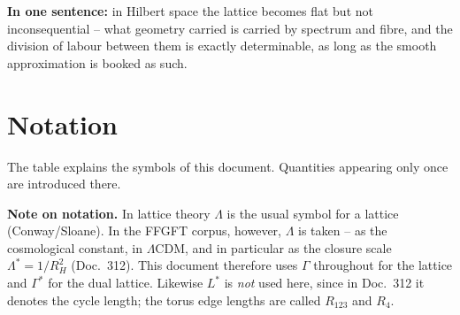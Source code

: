 \documentclass[11pt]{report}
\begin{document}
\medskip
\noindent\textbf{In one sentence:} in Hilbert space the lattice
becomes flat but not inconsequential -- what geometry carried is
carried by spectrum and fibre, and the division of labour between
them is exactly determinable, as long as the smooth approximation is
booked as such.

\section*{Notation}

The table explains the symbols of this document. Quantities
appearing only once are introduced there.

\textbf{Note on notation.} In lattice theory $\Lambda$ is the usual
symbol for a lattice (Conway/Sloane). In the FFGFT corpus, however,
$\Lambda$ is taken -- as the cosmological constant, in
$\Lambda$CDM, and in particular as the closure scale
$\Lambda^{*} = 1/R_H^2$ (Doc.~312). This document therefore uses
$\Gamma$ throughout for the lattice and $\Gamma^{*}$ for the dual
lattice. Likewise $L^{*}$ is \emph{not} used here, since in
Doc.~312 it denotes the cycle length; the torus edge lengths are
called $R_{123}$ and $R_4$.
\end{document}

